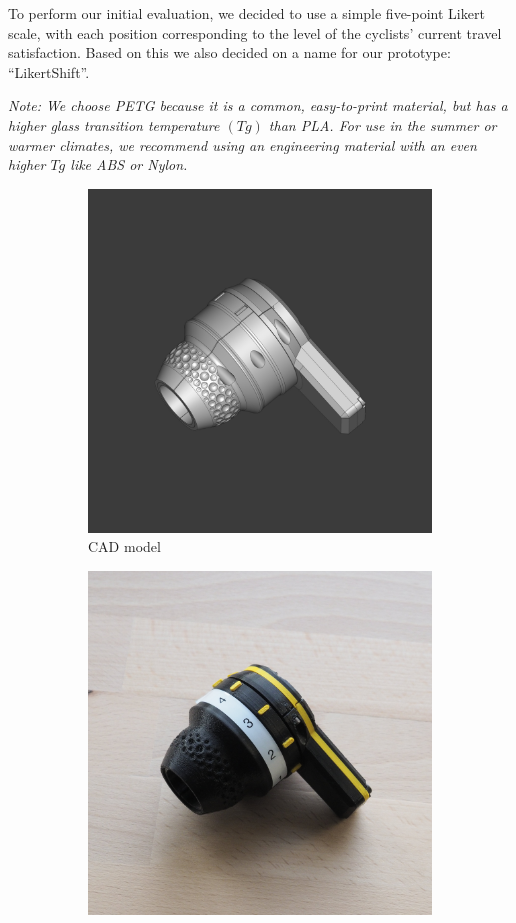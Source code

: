 To perform our initial evaluation, we decided to use a simple five-point Likert scale, with each position corresponding to the level of the cyclists' current travel satisfaction.
Based on this we also decided on a name for our prototype: “LikertShift”.

\bigbreak\noindent
\textit{%
    Note: We choose PETG because it is a common, easy-to-print material, but has a higher glass transition temperature $(Tg)$ than PLA. For use in the summer or warmer climates, we recommend using an engineering material with an even higher $Tg$ like ABS or Nylon.
}

\begin{figure}[!htb]
    \centering
    \begin{subfigure}{.3333\textwidth}
        \centering
        \includegraphics[width=.9\linewidth]{images/likertshift_freecad.jpg}
        \caption{CAD model}
    \end{subfigure}%
    \begin{subfigure}{.3333\textwidth}
        \centering
        \includegraphics[width=.9\linewidth]{images/likertshift_assembled.jpg}

\end{subfigure}
\end{figure}
